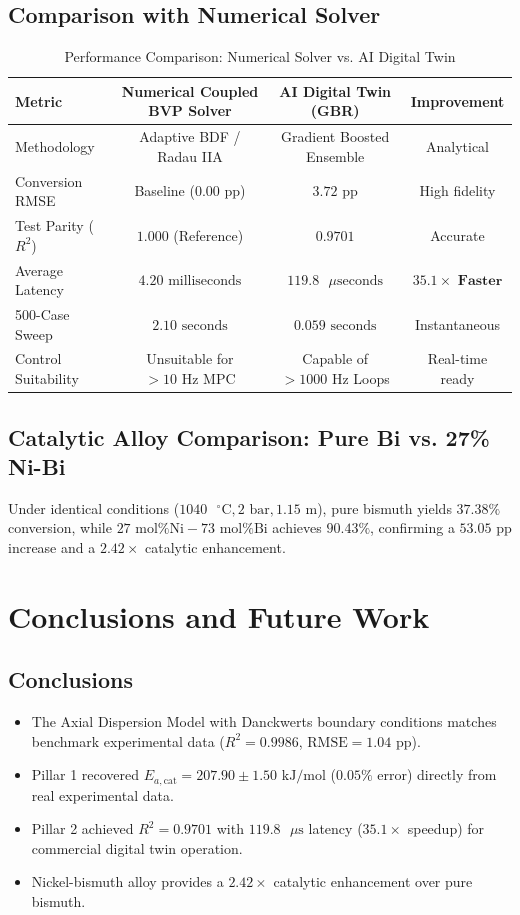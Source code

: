 \documentclass[12pt,a4paper,oneside]{report}
\begin{document}
\section{Comparison with Numerical Solver}
\begin{table}[ht]
\centering
\caption{Performance Comparison: Numerical Solver vs. AI Digital Twin}
\begin{tabular}{lccc}
\toprule
\textbf{Metric} & \textbf{Numerical Coupled BVP Solver} & \textbf{AI Digital Twin (GBR)} & \textbf{Improvement} \\
\midrule
Methodology & Adaptive BDF / Radau IIA & Gradient Boosted Ensemble & Analytical \\
Conversion RMSE & Baseline ($0.00\text{ pp}$) & $3.72\text{ pp}$ & High fidelity \\
Test Parity ($R^2$) & $1.000$ (Reference) & $0.9701$ & Accurate \\
Average Latency & $4.20\text{ milliseconds}$ & $119.8\text{ }\mu\text{seconds}$ & $\mathbf{35.1\times\text{ Faster}}$ \\
500-Case Sweep & $2.10\text{ seconds}$ & $0.059\text{ seconds}$ & Instantaneous \\
Control Suitability & Unsuitable for $>10\text{ Hz}$ MPC & Capable of $>1000\text{ Hz}$ Loops & Real-time ready \\
\bottomrule
\end{tabular}
\end{table}

\section{Catalytic Alloy Comparison: Pure Bi vs. 27\% Ni-Bi}
Under identical conditions ($1040\text{ }^\circ\text{C}, 2\text{ bar}, 1.15\text{ m}$), pure bismuth yields $37.38\%$ conversion, while $27\text{ mol\% Ni}-73\text{ mol\% Bi}$ achieves $90.43\%$, confirming a $53.05\text{ pp}$ increase and a $2.42\times$ catalytic enhancement.

\chapter{Conclusions and Future Work}
\section{Conclusions}
\begin{itemize}
    \item The Axial Dispersion Model with Danckwerts boundary conditions matches benchmark experimental data ($R^2 = 0.9986$, $\text{RMSE} = 1.04\text{ pp}$).
    \item Pillar 1 recovered $E_{a,\text{cat}} = 207.90 \pm 1.50\text{ kJ/mol}$ ($0.05\%$ error) directly from real experimental data.
    \item Pillar 2 achieved $R^2 = 0.9701$ with $119.8\text{ }\mu\text{s}$ latency ($35.1\times$ speedup) for commercial digital twin operation.
    \item Nickel-bismuth alloy provides a $2.42\times$ catalytic enhancement over pure bismuth.
\end{itemize}
\end{document}
